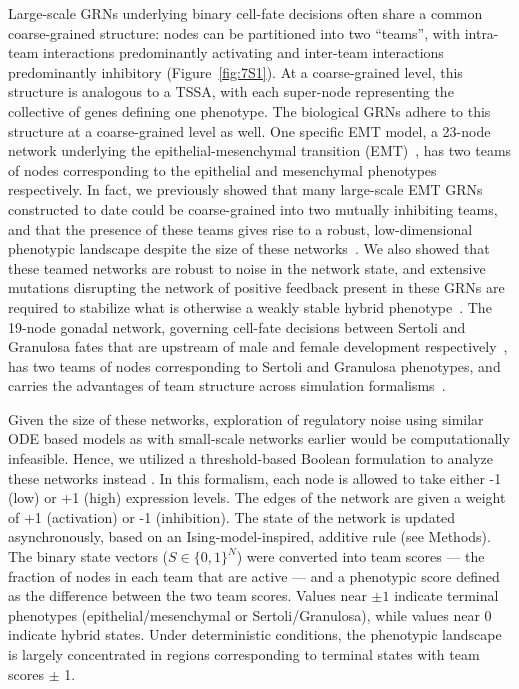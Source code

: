\documentclass[11pt]{article}
\begin{document}
Large-scale GRNs underlying binary cell-fate decisions often share a common coarse-grained structure: nodes can be partitioned into two ``teams'', with intra-team interactions predominantly activating and inter-team interactions predominantly inhibitory (Figure~\ref{fig:7S1}). At a coarse-grained level, this structure is analogous to a TSSA, with each super-node representing the collective of genes defining one phenotype. The biological GRNs adhere to this structure at a coarse-grained level as well. One specific EMT model, a 23-node network underlying the epithelial-mesenchymal transition (EMT)~\cite{Huang2017}, has two teams of nodes corresponding to the epithelial and mesenchymal phenotypes respectively. In fact, we previously showed that many large-scale EMT GRNs constructed to date could be coarse-grained into two mutually inhibiting teams, and that the presence of these teams gives rise to a robust, low-dimensional phenotypic landscape despite the size of these networks~\cite{hari2022landscape,tripathi2023minimal,hari2023low}. We also showed that these teamed networks are robust to noise in the network state, and extensive mutations disrupting the network of positive feedback present in these GRNs are required to stabilize what is otherwise a weakly stable hybrid phenotype~\cite{rashid2022network, Hari2025APlasticity}. The 19-node gonadal network, governing cell-fate decisions between Sertoli and Granulosa fates that are upstream of male and female development respectively~\cite{rios2015boolean}, has two teams of nodes corresponding to Sertoli and Granulosa phenotypes, and carries the advantages of team structure across simulation formalisms~\cite{Hari2025LowNetworks, Shyam2025MutuallyNetworks}.

Given the size of these networks, exploration of regulatory noise using similar ODE based models as with small-scale networks earlier would be computationally infeasible. Hence, we utilized a threshold-based Boolean formulation to analyze these networks instead \cite{FontClos2018}. In this formalism, each node is allowed to take either -1 (low) or +1 (high) expression levels. The edges of the network are given a weight of +1 (activation) or -1 (inhibition). The state of the network is updated asynchronously, based on an Ising-model-inspired, additive rule (see Methods). The binary state vectors ($S \in \{0, 1\}^N$) were converted into team scores --- the fraction of nodes in each team that are active --- and a phenotypic score defined as the difference between the two team scores. Values near $\pm 1$ indicate terminal phenotypes (epithelial/mesenchymal or Sertoli/Granulosa), while values near 0 indicate hybrid states. Under deterministic conditions, the phenotypic landscape is largely concentrated in regions corresponding to terminal states with team scores $\pm$ 1. 
\end{document}
